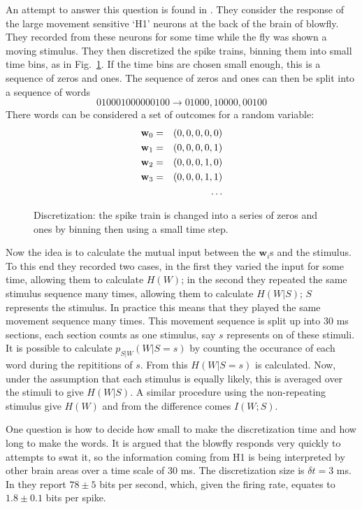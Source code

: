 \documentclass[12pt]{article}
\begin{document}
An attempt to answer this question is found in
\cite{StrongEtAl1998}. They consider the response of the large
movement sensitive \lq{}H1\rq{} neurons at the back of the brain of
blowfly. They recorded from these neurons for some time while the fly
was shown a moving stimulus. They then discretized the spike trains,
binning them into small time bins, as in
Fig.~\ref{fig_discretization}. If the time bins are chosen small
enough, this is a sequence of zeros and ones. The sequence of zeros
and ones can then be split into a sequence of words
\begin{equation}
010001000000100\rightarrow 01000,10000,00100
\end{equation}
There words can be considered a set of outcomes for a random variable:
\begin{eqnarray}
\textbf{w}_0&=&(0,0,0,0,0)\cr
\textbf{w}_1&=&(0,0,0,0,1)\cr
\textbf{w}_2&=&(0,0,0,1,0)\cr
\textbf{w}_3&=&(0,0,0,1,1)\cr
&&\ldots
\end{eqnarray}

\begin{figure}[htb]
\begin{center}

\end{center}
\caption{Discretization: the spike train is changed into a series of
  zeros and ones by binning then using a small time
  step.\label{fig_discretization}}
\end{figure}

Now the idea is to calculate the mutual input between the
$\textbf{w}_i$s and the stimulus. To this end they recorded two cases,
in the first they varied the input for some time, allowing them to
calculate $H(W)$; in the second they repeated the same stimulus
sequence many times, allowing them to calculate $H(W|S)$; $S$
represents the stimulus. In practice this means that they played the
same movement sequence many times. This movement sequence is split up
into 30 ms sections, each section counts as one stimulus, say $s$
represents on of these stimuli. It is possible to calculate
$p_{S|W}(W|S=s)$ by counting the occurance of each word during the
repititions of $s$. From this $H(W|S=s)$ is calculated. Now, under the
assumption that each stimulus is equally likely, this is averaged over
the stimuli to give $H(W|S)$. A similar procedure using the
non-repeating stimulus give $H(W)$ and from the difference comes
$I(W;S)$.

One question is how to decide how small to make the discretization
time and how long to make the words. It is argued that the blowfly
responds very quickly to attempts to swat it, so the information
coming from H1 is being interpreted by other brain areas over a time
scale of 30 ms. The discretization size is $\delta t=3$ ms. In
\cite{StrongEtAl1998} they report $78\pm 5$ bits per second, which,
given the firing rate, equates to $1.8\pm 0.1$ bits per
spike. 
\end{document}
